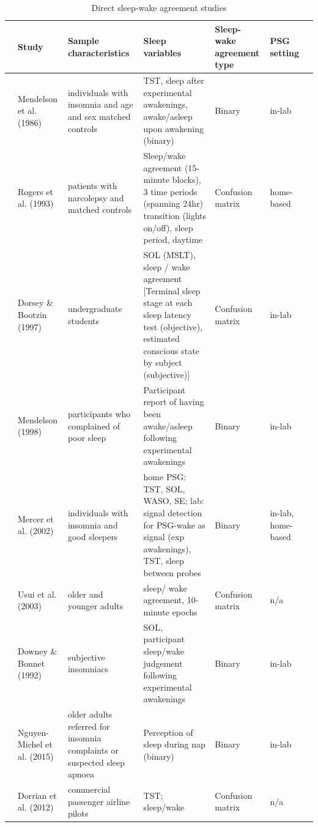 \documentclass[
]{article}
\begin{document}
\begin{table}[!h]
\centering
\caption{\label{tab:sleepwake}Direct sleep-wake agreement studies}
\centering
\fontsize{8}{10}\selectfont
\begin{threeparttable}
\begin{tabular}[t]{>{\raggedright\arraybackslash}p{2em}>{\raggedright\arraybackslash}p{6em}>{\raggedright\arraybackslash}p{12em}>{\raggedright\arraybackslash}p{16em}>{\raggedright\arraybackslash}p{6em}>{\raggedright\arraybackslash}p{6em}>{}p{6em}}
\toprule
  & Study & Sample characteristics & Sleep variables & Sleep-wake agreement type & PSG setting\\
\midrule
60 & Mendelson et al. (1986) & individuals with insomnia and age and sex matched controls & TST, sleep after experimental awakenings, awake/asleep upon awakening (binary) & Binary & in-lab\\
73 & Rogers et al. (1993) & patients with narcolepsy and matched controls & Sleep/wake agreement (15-minute blocks), 3 time periods (spanning 24hr) transition (lights on/off), sleep period, daytime & Confusion matrix & home-based\\
101 & Dorsey \& Bootzin (1997) & undergraduate students & SOL (MSLT), sleep / wake agreement [Terminal sleep stage at each sleep latency test (objective), estimated conscious state by subject (subjective)] & Confusion matrix & in-lab\\
123 & Mendelson (1998) & participants who complained of poor sleep & Participant report of having been awake/asleep following experimental awakenings & Binary & in-lab\\
124 & Mercer et al. (2002) & individuals with insomnia and good sleepers & home PSG: TST, SOL, WASO, SE; lab: signal detection for PSG-wake as signal (exp awakenings), TST, sleep between probes & Binary & in-lab, home-based\\
\addlinespace
139 & Usui et al. (2003) & older and younger adults & sleep/ wake agreement, 10-minute epochs & Confusion matrix & n/a\\
152 & Downey \& Bonnet (1992) & subjective insomniacs & SOL, participant sleep/wake judgement following experimental awakenings & Binary & in-lab\\
165 & Nguyen-Michel et al. (2015) & older adults referred for insomnia complaints or suspected sleep apnoea & Perception of sleep during nap (binary) & Binary & in-lab\\
170 & Dorrian et al. (2012) & commercial passenger airline pilots & TST; sleep/wake & Confusion matrix & n/a\\

\end{tabular}
\end{threeparttable}
\end{table}
\end{document}
